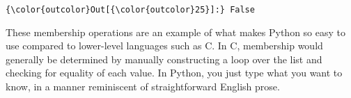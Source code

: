 \documentclass[11pt]{article}
\begin{document}
            \begin{Verbatim}[commandchars=\\\{\}]
{\color{outcolor}Out[{\color{outcolor}25}]:} False
\end{Verbatim}
        
    These membership operations are an example of what makes Python so easy
to use compared to lower-level languages such as C. In C, membership
would generally be determined by manually constructing a loop over the
list and checking for equality of each value. In Python, you just type
what you want to know, in a manner reminiscent of straightforward
English prose.


    
    
    
    
\end{document}
